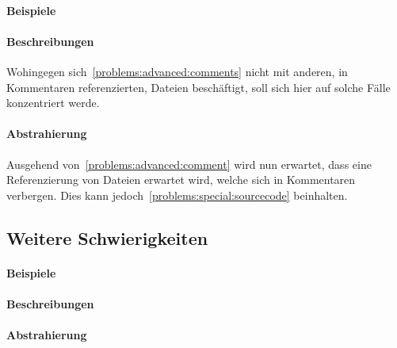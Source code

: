 \paragraph*{Beispiele}
\paragraph*{Beschreibungen}
Wohingegen sich~\ref{problems:advanced:comments} nicht mit anderen, in Kommentaren referenzierten, Dateien beschäftigt, soll sich hier auf solche Fälle konzentriert werde.
\paragraph*{Abstrahierung}
Ausgehend von~\ref{problems:advanced:comment} wird nun erwartet, dass eine Referenzierung von Dateien erwartet wird, welche sich in Kommentaren verbergen. Dies kann jedoch~\ref{problems:special:sourcecode} beinhalten.


\subsection{Weitere Schwierigkeiten}\label{problems:additional}
\paragraph*{Beispiele}
\paragraph*{Beschreibungen}
\paragraph*{Abstrahierung}
